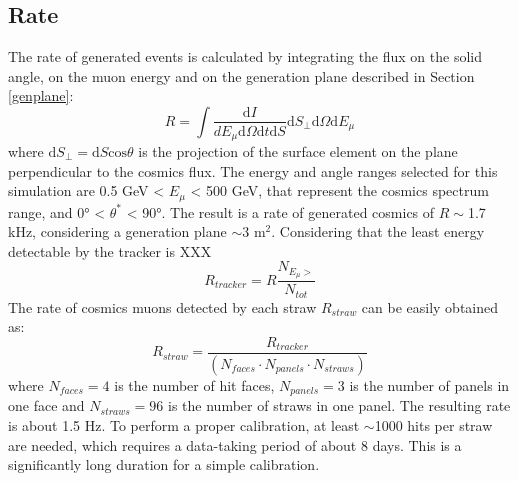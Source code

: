 \subsection{Rate}\label{ratetracker}
The rate of generated events is calculated by integrating the flux on the solid angle, on the muon energy and on the generation plane described in Section \ref{genplane}:
\begin{equation}
   R= \int \frac{\text{d} I}{d E_\mu \text{d} \Omega \text{d} t \text{d} S} \text{d} S_{\perp} \text{d} \Omega \text{d} E_\mu
    \end{equation}
where $\text{d}S_\perp= \text{d}S \text{cos}\theta$ is the projection of the surface element on the plane perpendicular to the cosmics flux. 
The energy and angle ranges selected for this simulation are 0.5 GeV < $E_\mu$ < 500 GeV, that represent the cosmics spectrum range, and 0° < $\theta^*$ < 90°.
The result is a rate of generated cosmics of $R\sim$1.7 kHz, considering a generation plane $\sim 3$ m$^2$.
Considering that the least energy detectable by the tracker is XXX
\begin{equation}
    R_{tracker}=R\frac{N_{E_\mu >}}{N_{tot}}
\end{equation}
The rate of cosmics muons detected by each straw $R_{straw}$ can be easily obtained as:
\begin{equation}
    R_{straw}=\frac{R_{tracker}}{(N_{faces}\cdot N_{panels}\cdot N_{straws} )}
\end{equation}
where $N_{faces}=4$ is the number of hit faces, $N_{panels}=3$ is the number of panels in one face and $N_{straws}=96$ is the number of straws in one panel.
The resulting rate is about 1.5 Hz. To perform a proper calibration, at least $\sim$1000 hits per straw are needed, which requires a data-taking period of about 8 days.
This is a significantly long duration for a simple calibration.

